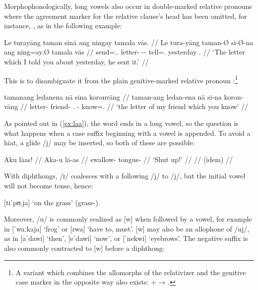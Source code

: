 Morphophonologically, long vowels also occur in double-marked relative pronouns 
where the agreement marker for the relative clause's head has been omitted,
for instance, , as in the following 
example:\label{doublerel}

\ex\begingl
	\gla Le turayāng taman sinā ang ningay tamala vās. //
	\glb Le tura-yāng taman-Ø si-Ø-na ang ning=ay.Ø tamala vās //
	\glc \PatTI{} send=\Tsg{}.\M{}.\Aarg{} letter-\Top{} \Rel{}-\PatTI{}-\Gen{} \AgtT{} tell=\Fsg{}.\Top{} yesterday \Ssg{}.\Parg{} //
	\glft `The letter which I told you about yesterday, he sent it.' //
\endgl\xe

\noindent This is to disambiguate it from the plain genitive-marked relative pronoun 
:\footnote{A variant which combines the 
allomorphs of the relativizer and the genitive case marker in the opposite way 
also exists:  +  → .}

\ex\begingl
	\gla tamanang ledanena nā sina koronvāng //
	\glb taman-ang ledan-ena nā si-na koron-vāng //
	\glc letter-\Aarg{} friend-\Gen{} \Fsg.\Gen{} \Rel{}-\Gen{} know=\Ssg{}.\Aarg{} //
	\glft `the letter of my friend which you know' //
\endgl\xe

As pointed out in (\ref{ex:laa}), the word  ends in a 
long vowel, so the question is what happens when a case suffix beginning with a 
vowel is appended. To avoid a hiat, a glide /j/ may be inserted, so both of 
these are possible:

\pex
	\a\begingl
		\gla Aku lāas! //
		\glb Aka-u lā-as //
		\glc swallow-\Imp{} tongue-\Parg{} //
		\glft `Shut up!' //
	\endgl
	\a\begingl
		 //
		\glb (idem) //
	\endgl
\xe

\noindent With diphthongs, /ɪ/ coalesces with a following /j/ to /j/, but the 
initial vowel will not become tense, hence:

\ex
	 [tiˈpʊ.ja] `on the grass' (grass-\Loc{}).
\xe

Moreover, /u/ is commonly realized as [w] when followed by a vowel, for example 
in  [ˈwaːkaja] `frog' or  [rwa] `have 
to, must'. [w] may also be an allophone of /uj/, as in  
[aˈdawi] `then',  [eˈdawi] `now', or  
[ˈnekwi] `eyebrows'. The negative suffix  is also commonly 
contracted to [w] before a diphthong:

